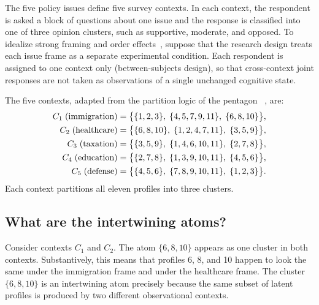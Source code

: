 \documentclass[aps,pra,twocolumn,superscriptaddress,floatfix,longbibliography]{revtex4-2}
\begin{document}
The five policy issues define five survey contexts. In each context,
the respondent is asked a block of questions about one issue and the
response is classified into one of three opinion clusters, such as
supportive, moderate, and opposed. To idealize strong framing and
order effects~\cite{Moore2002}, suppose that the research design
treats each issue frame as a separate experimental condition. Each
respondent is assigned to one context only (between-subjects
design), so that cross-context joint responses are not taken as
observations of a single unchanged cognitive state.

The five contexts, adapted from the partition logic of the pentagon
~\cite{greechie-1974,wright:pent,svozil-2018-b}, are:
\begin{align}
C_1\;\text{(immigration)} &= \bigl\{\{1,2,3\},\;\{4,5,7,9,11\},\;
\{6,8,10\}\bigr\},
\notag\\
C_2\;\text{(healthcare)} &= \bigl\{\{6,8,10\},\;\{1,2,4,7,11\},\;
\{3,5,9\}\bigr\},
\notag\\
C_3\;\text{(taxation)} &= \bigl\{\{3,5,9\},\;\{1,4,6,10,11\},\;
\{2,7,8\}\bigr\},
\label{eq:pentagon}\\
C_4\;\text{(education)} &= \bigl\{\{2,7,8\},\;\{1,3,9,10,11\},\;
\{4,5,6\}\bigr\},
\notag\\
C_5\;\text{(defense)} &= \bigl\{\{4,5,6\},\;\{7,8,9,10,11\},\;
\{1,2,3\}\bigr\}.
\notag
\end{align}
Each context partitions all eleven profiles into three clusters.

\subsection{What are the intertwining atoms?}

Consider contexts $C_1$ and $C_2$. The atom $\{6,8,10\}$ appears as
one cluster in both contexts. Substantively, this means that profiles
6, 8, and 10 happen to look the same under the immigration frame and
under the healthcare frame. The cluster $\{6,8,10\}$ is an
intertwining atom precisely because the same subset of latent
profiles is produced by two different observational contexts.
\end{document}
